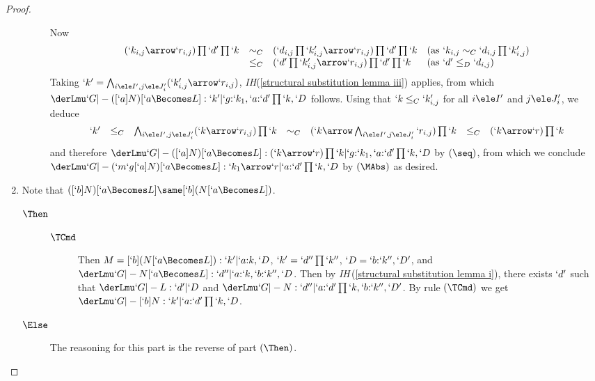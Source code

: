 \documentclass{CSML}
\begin{document}
\begin{proof}
\begin{enumerate}
\begin{description}
Now
 \[ \begin{array}{lll@{\quad}l}
(`k_{i,j}\arrow `r_{i,j})\prod `d'\prod `k & \sim_C & (`d_{i,j}\prod `k'_{i,j}\arrow `r_{i,j})\prod `d'\prod `k & (\textrm{as }`k_{i,j} \sim_C `d_{i,j}\prod `k'_{i,j}) \\
& \leq_C & (`d'\prod `k'_{i,j}\arrow `r_{i,j})\prod `d'\prod `k & (\textrm{as }`d' \leq_D `d_{i,j})
 \end{array}\]
Taking $`k' = \bigwedge_{i\ele I', j\ele J'_i} ( `k'_{i,j}\arrow `r_{i,j})$, \emph{IH}\skp(\ref{structural substitution lemma iii}) applies, 
from which 
$\derLmu `G |- {([`a]N)[`a \Becomes L]} : `k' | `g{:}`k_1, `a{:}`d'\prod `k,`D $ follows. 
Using that $`k \leq_C `k'_{i,j}$ for all $i\ele I'$ and $j\ele J'_i$, we deduce
 \[ \begin{array}{rcl@{\quad}lccc}
`k' &\leq_C& \bigwedge_{i\ele I', j\ele J'_i}(`k\arrow `r_{i,j} )\prod `k &\sim_C&
(`k\arrow \bigwedge_{i\ele I', j\ele J'_i}`r_{i,j} )\prod `k &\leq_C& 
(`k\arrow `r )\prod `k
 \end{array} \]
and therefore $\derLmu `G |- ([`a]N)[`a \Becomes L] : (`k\arrow `r )\prod `k | `g{:}`k_1, `a{:}`d'\prod `k,`D $ by
$(\seq)$, from which we conclude
$\derLmu `G |- {(`m`g[`a]N)[`a \Becomes L]} : `k_1\arrow `r | `a{:}`d'\prod `k,`D $ by $(\MAbs)$ as desired.
 \end{description}\medskip

	
 \item %
Note that $([`b]N)[`a\Becomes L] \same [`b] (N[`a\Becomes L])$.

 \begin{description} 

 \item [$\Then$]

 \begin{description} 

 \item [$\TCmd$]
Then $M = [`b](N[`a\Becomes L]) : `k' | `a{:}k,`D $, $`k' = `d''\prod `k''$, $`D = `b{:}`k'',`D'$, and $ \derLmu `G |- {N[`a\Becomes L]} : `d'' | `a{:}`k,`b{:}`k'',`D $.
Then by \emph{IH}\,(\ref{structural substitution lemma i}), there exists $`d'$ such that $ \derLmu `G |- L : `d' | `D $ and $\derLmu `G |- N : `d'' | `a{:}`d'\prod`k,`b{:}`k'',`D' $.
By rule $(\TCmd)$ we get $\derLmu `G |- {[`b]N} : `k' | `a{:}`d'\prod`k,`D $.
 \end{description}

 \item[$\Else$] 
The reasoning for this part is the reverse of part $(\Then)$.


\end{description}
\end{enumerate}
\end{proof}
\end{document}
